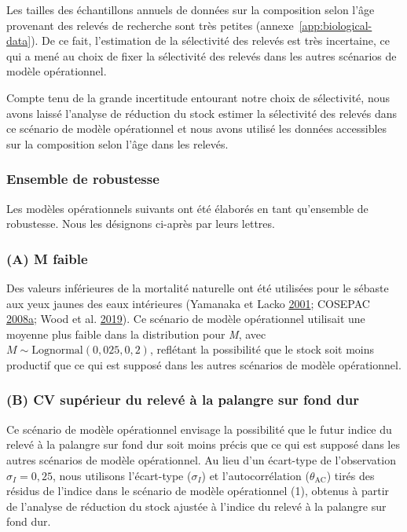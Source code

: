\documentclass[french,11pt]{book}
\begin{document}
Les tailles des échantillons annuels de données sur la composition selon l'âge provenant des relevés de recherche sont très petites (annexe~\ref{app:biological-data}). De ce fait, l'estimation de la sélectivité des relevés est très incertaine, ce qui a mené au choix de fixer la sélectivité des relevés dans les autres scénarios de modèle opérationnel.

Compte tenu de la grande incertitude entourant notre choix de sélectivité, nous avons laissé l'analyse de réduction du stock estimer la sélectivité des relevés dans ce scénario de modèle opérationnel et nous avons utilisé les données accessibles sur la composition selon l'âge dans les relevés.

\hypertarget{sec:approach3-robustness}{%
\subsubsection{Ensemble de robustesse}\label{sec:approach3-robustness}}

Les modèles opérationnels suivants ont été élaborés en tant qu'ensemble de robustesse. Nous les désignons ci-après par leurs lettres.

\hypertarget{sec:approach3-referenceA}{%
\subsubsection{(A) M faible}\label{sec:approach3-referenceA}}

Des valeurs inférieures de la mortalité naturelle ont été utilisées pour le sébaste aux yeux jaunes des eaux intérieures (Yamanaka et Lacko \protect\hyperlink{ref-yamanaka2001}{2001}; COSEPAC \protect\hyperlink{ref-cosewic2008}{2008}\protect\hyperlink{ref-cosewic2008}{a}; Wood et al. \protect\hyperlink{ref-wood2019}{2019}). Ce scénario de modèle opérationnel utilisait une moyenne plus faible dans la distribution pour \emph{M}, avec \(M \sim \textrm{Lognormal}(0,025, 0,2)\), reflétant la possibilité que le stock soit moins productif que ce qui est supposé dans les autres scénarios de modèle opérationnel.

\hypertarget{sec:approach3-referenceB}{%
\subsubsection{(B) CV supérieur du relevé à la palangre sur fond dur}\label{sec:approach3-referenceB}}

Ce scénario de modèle opérationnel envisage la possibilité que le futur indice du relevé à la palangre sur fond dur soit moins précis que ce qui est supposé dans les autres scénarios de modèle opérationnel. Au lieu d'un écart-type de l'observation \(\sigma_I = 0,25\), nous utilisons l'écart-type (\(\sigma_I\)) et l'autocorrélation (\(\theta_\textrm{AC}\)) tirés des résidus de l'indice dans le scénario de modèle opérationnel (1), obtenus à partir de l'analyse de réduction du stock ajustée à l'indice du relevé à la palangre sur fond dur.
\end{document}
